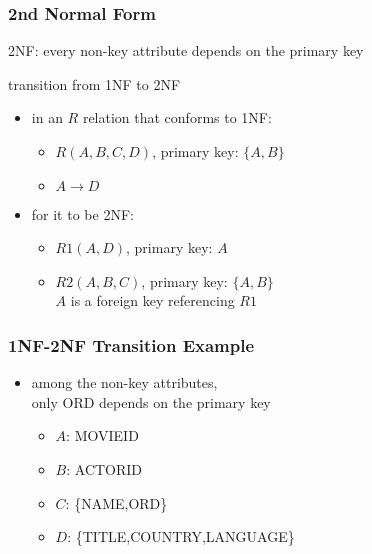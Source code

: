 \documentclass[dvipsnames]{beamer}
\begin{document}
\begin{frame}
  \frametitle{2nd Normal Form}

  \begin{definition}
    \alert{2NF}: every non-key attribute depends on the primary key
  \end{definition}

  \begin{block}{transition from 1NF to 2NF}
    \begin{itemize}
      \item in an $R$ relation that conforms to 1NF:
      \begin{itemize}
        \item $R(A,B,C,D)$, primary key: $\{A,B\}$
        \item $A \rightarrow D$
      \end{itemize}

      \pause
      \item for it to be 2NF:
      \begin{itemize}
        \item $R1(A,D)$, primary key: $A$
        \item $R2(A,B,C)$, primary key: $\{A,B\}$\\
          $A$ is a foreign key referencing $R1$
      \end{itemize}
    \end{itemize}
  \end{block}
\end{frame}

\begin{frame}
  \frametitle{1NF-2NF Transition Example}

  \begin{example}
    \begin{itemize}
      \item among the non-key attributes,\\
	only ORD depends on the primary key

      \pause
      \begin{itemize}
        \item $A$: MOVIEID
        \item $B$: ACTORID
        \item $C$: \{NAME,ORD\}
        \item $D$: \{TITLE,COUNTRY,LANGUAGE\}
      \end{itemize}
    \end{itemize}
  \end{example}
\end{frame}
\end{document}
